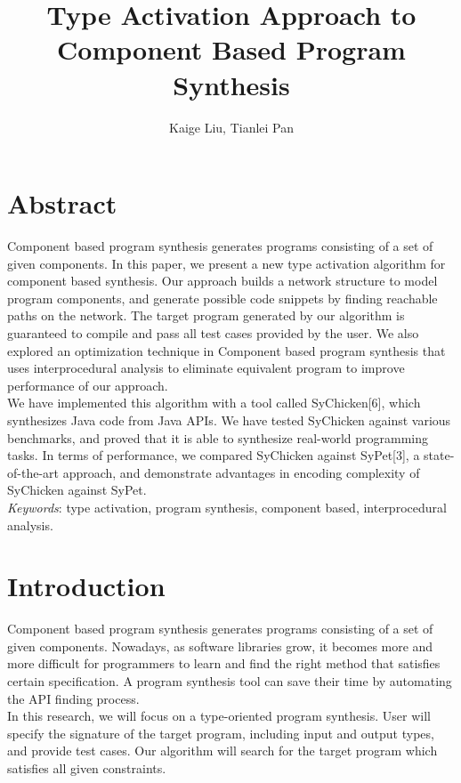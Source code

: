 \documentclass[twocolumn]{article}
\title{Type Activation Approach to Component Based Program Synthesis}
\author{Kaige Liu, Tianlei Pan}
\date{}
\begin{document}
\maketitle
\section*{Abstract}
Component based program synthesis generates programs consisting of a set of given components. In this paper, we present a new type activation algorithm for component based synthesis. Our approach builds a network structure to model program components, and generate possible code snippets by finding reachable paths on the network. The target program generated by our algorithm is guaranteed to compile and pass all test cases provided by the user. We also explored an optimization technique in Component based program synthesis that uses interprocedural analysis to eliminate equivalent program to improve performance of our approach.\\

We have implemented this algorithm with a tool called SyChicken[6], which synthesizes Java code from Java APIs. We have tested SyChicken against various benchmarks, and proved that it is able to synthesize real-world programming tasks. In terms of performance, we compared SyChicken against SyPet[3], a state-of-the-art approach, and demonstrate advantages in encoding complexity of SyChicken against SyPet.\\


\textit{Keywords}: type activation, program synthesis, component based, interprocedural analysis.\\


\section{Introduction}
Component based program synthesis generates programs consisting of a set of given components. Nowadays, as software libraries grow, it becomes more and more difficult for programmers to learn and find the right method that satisfies certain specification. A program synthesis tool can save their time by automating the API finding process.\\

In this research, we will focus on a type-oriented program synthesis. User will specify the signature of the target program, including input and output types, and provide test cases. Our algorithm will search for the target program which satisfies all given constraints.
\end{document}
